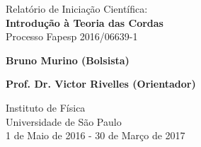 \begin{titlepage}
    \begin{center}
        \vspace*{10em}
        
        \Large
        Relatório de Iniciação Científica:\\
        \vspace{1em}
        \Huge
        \textbf{Introdução à Teoria das Cordas}\\
        \vspace{1em}
        \large
        Processo Fapesp 2016/06639-1
        
        \vfill
        \begin{flushright}
        \Large
        \textbf{Bruno Murino (Bolsista)}
        
        \vspace{8em}
        \Large
        \textbf{Prof. Dr. Victor Rivelles (Orientador)}
        \end{flushright}
        
        \vspace{8em}
        
        \Large
        Instituto de Física\\
        Universidade de São Paulo\\
        1 de Maio de 2016 - 30 de Março de 2017
        
    \end{center}
\end{titlepage}
